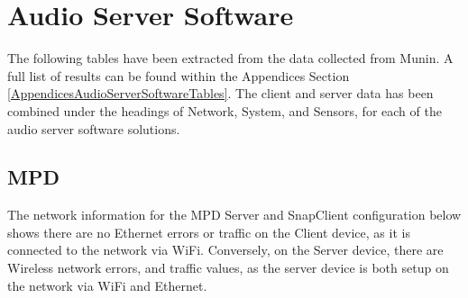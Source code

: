 \documentclass[11pt,a4paper,headinclude=false,footinclude=false]{scrreprt}
\begin{document}
\section{\texorpdfstring{Audio Server Software
\label{AudioServerSoftwareResults}}{Audio Server Software }}\label{audio-server-software}

The following tables have been extracted from the data collected from
Munin. A full list of results can be found within the Appendices Section
\ref{AppendicesAudioServerSoftwareTables}. The client and server data
has been combined under the headings of Network, System, and Sensors,
for each of the audio server software solutions.

\subsection{MPD}\label{mpd-1}

The network information for the MPD Server and SnapClient configuration
below shows there are no Ethernet errors or traffic on the Client
device, as it is connected to the network via WiFi. Conversely, on the
Server device, there are Wireless network errors, and traffic values, as
the server device is both setup on the network via WiFi and Ethernet.
\end{document}
